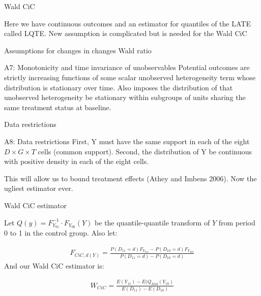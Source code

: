 \documentclass{beamer}
\begin{document}
\begin{frame}{Wald CiC}

Here we have continuous outcomes and an estimator for quantiles of the LATE called LQTE.  New assumption is complicated but is needed for the Wald CiC

\end{frame}

\begin{frame}{Assumptions for changes in changes Wald ratio}


\begin{block}{A7: Monotonicity and time invariance of unobservables}
Potential outcomes are strictly increasing functions of some scalar unobserved heterogeneity term whose distribution is stationary over time.  Also imposes the distribution of that unobserved heterogeneity be stationary within subgroups of units sharing the same treatment status at baseline.
\end{block}

\end{frame}

\begin{frame}{Data restrictions}

\begin{block}{A8: Data restrictions}
First, Y must have the same support in each of the eight $D \times G \times T$ cells (common support).  Second, the distribution of Y be continuous with positive density in each of the eight cells.
\end{block}

This will allow us to bound treatment effects (Athey and Imbens 2006). Now the ugliest estimator ever.

\end{frame}

\begin{frame}{Wald CiC estimator}

Let $Q(y) = F_{Y_{01}}^{-1} \cdot F_{Y_{00}}(Y)$ be the quantile-quantile transform of $Y$ from period 0 to 1 in the control group.  Also let:

\begin{eqnarray*}
F_{CiC,d(Y)} = \frac{
P(D_{11}=d) F_{Y_{d11}} - 
P(D_{10}=d) F_{Y_{d10}}}{
P(D_{11}=d) - P(D_{10}=d)}
\end{eqnarray*}And our Wald CiC estimator is:

\begin{eqnarray*}
W_{CiC} = \frac{
E(Y_{11}) - E(Q_{D10}(Y_{10})}
{E(D_{11}) - E(D_{10})}
\end{eqnarray*}

\end{frame}
\end{document}
